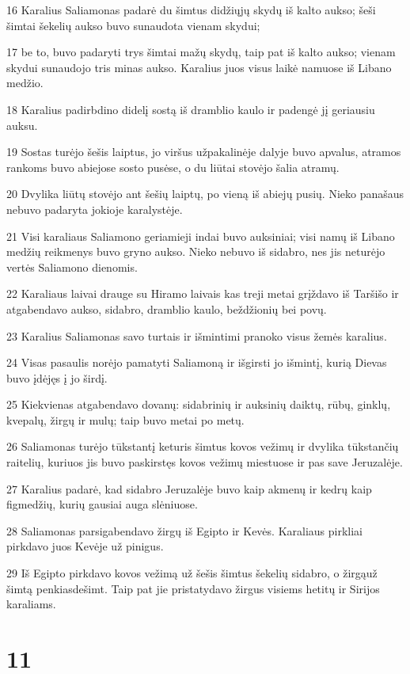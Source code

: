 \par 16 Karalius Saliamonas padarė du šimtus didžiųjų skydų iš kalto aukso; šeši šimtai šekelių aukso buvo sunaudota vienam skydui; 
\par 17 be to, buvo padaryti trys šimtai mažų skydų, taip pat iš kalto aukso; vienam skydui sunaudojo tris minas aukso. Karalius juos visus laikė namuose iš Libano medžio. 
\par 18 Karalius padirbdino didelį sostą iš dramblio kaulo ir padengė jį geriausiu auksu. 
\par 19 Sostas turėjo šešis laiptus, jo viršus užpakalinėje dalyje buvo apvalus, atramos rankoms buvo abiejose sosto pusėse, o du liūtai stovėjo šalia atramų. 
\par 20 Dvylika liūtų stovėjo ant šešių laiptų, po vieną iš abiejų pusių. Nieko panašaus nebuvo padaryta jokioje karalystėje. 
\par 21 Visi karaliaus Saliamono geriamieji indai buvo auksiniai; visi namų iš Libano medžių reikmenys buvo gryno aukso. Nieko nebuvo iš sidabro, nes jis neturėjo vertės Saliamono dienomis. 
\par 22 Karaliaus laivai drauge su Hiramo laivais kas treji metai grįždavo iš Taršišo ir atgabendavo aukso, sidabro, dramblio kaulo, beždžionių bei povų. 
\par 23 Karalius Saliamonas savo turtais ir išmintimi pranoko visus žemės karalius. 
\par 24 Visas pasaulis norėjo pamatyti Saliamoną ir išgirsti jo išmintį, kurią Dievas buvo įdėjęs į jo širdį. 
\par 25 Kiekvienas atgabendavo dovanų: sidabrinių ir auksinių daiktų, rūbų, ginklų, kvepalų, žirgų ir mulų; taip buvo metai po metų. 
\par 26 Saliamonas turėjo tūkstantį keturis šimtus kovos vežimų ir dvylika tūkstančių raitelių, kuriuos jis buvo paskirstęs kovos vežimų miestuose ir pas save Jeruzalėje. 
\par 27 Karalius padarė, kad sidabro Jeruzalėje buvo kaip akmenų ir kedrų kaip figmedžių, kurių gausiai auga slėniuose. 
\par 28 Saliamonas parsigabendavo žirgų iš Egipto ir Kevės. Karaliaus pirkliai pirkdavo juos Kevėje už pinigus. 
\par 29 Iš Egipto pirkdavo kovos vežimą už šešis šimtus šekelių sidabro, o žirgą­už šimtą penkiasdešimt. Taip pat jie pristatydavo žirgus visiems hetitų ir Sirijos karaliams.



\chapter{11}


